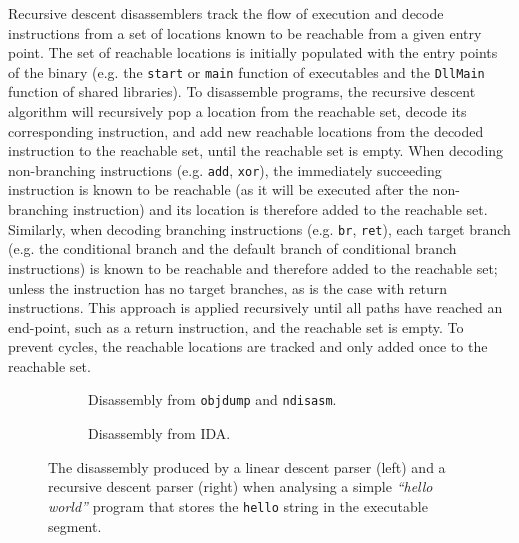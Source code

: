 Recursive descent disassemblers track the flow of execution and decode instructions from a set of locations known to be reachable from a given entry point. The set of reachable locations is initially populated with the entry points of the binary (e.g. the \texttt{start} or \texttt{main} function of executables and the \texttt{DllMain} function of shared libraries). To disassemble programs, the recursive descent algorithm will recursively pop a location from the reachable set, decode its corresponding instruction, and add new reachable locations from the decoded instruction to the reachable set, until the reachable set is empty. When decoding non-branching instructions (e.g. \texttt{add}, \texttt{xor}), the immediately succeeding instruction is known to be reachable (as it will be executed after the non-branching instruction) and its location is therefore added to the reachable set. Similarly, when decoding branching instructions (e.g. \texttt{br}, \texttt{ret}), each target branch (e.g. the conditional branch and the default branch of conditional branch instructions) is known to be reachable and therefore added to the reachable set; unless the instruction has no target branches, as is the case with return instructions. This approach is applied recursively until all paths have reached an end-point, such as a return instruction, and the reachable set is empty. To prevent cycles, the reachable locations are tracked and only added once to the reachable set.

\begin{figure}[htbp]
	\centering
	\begin{subfigure}[t]{0.49\textwidth}
		
		\caption{Disassembly from \texttt{objdump} and \texttt{ndisasm}\protect\footnotemark.}
	\end{subfigure}
	\qquad
	\begin{subfigure}[t]{0.35\textwidth}
		
		\caption{Disassembly from IDA.}
	\end{subfigure}
	\caption{The disassembly produced by a linear descent parser (left) and a recursive descent parser (right) when analysing a simple \textit{``hello world''} program that stores the \texttt{hello} string in the executable segment.}
	\label{fig:comparison_between_linear_and_recursive_descent}
\end{figure}

